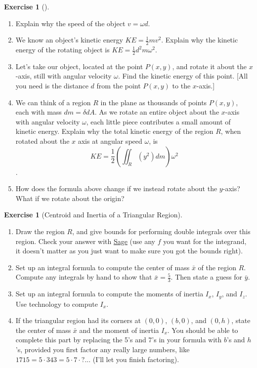 \documentclass[10pt,]{book}
\theoremstyle{plain}
\theoremstyle{definition}
\theoremstyle{definition}
\theoremstyle{definition}
\theoremstyle{definition}
\newtheorem{exploration}[project]{Exercise}
\theoremstyle{definition}
\numberwithin{equation}{section}
\newcommand{\sageDoubleIntegralCheckerURL}{http://bmw.byuimath.com/dokuwiki/doku.php?id=double_integral_calculator}
\begin{document}
\begin{exploration}[]\label{exploration-253}
\leavevmode%
\begin{enumerate}[font=\bfseries,label=(\alph*),ref=\alph*]
\item\label{task-690} Explain why the speed of the object \(v=\omega d\).%
\item\label{task-691} We know an object's kinetic energy \(KE=\frac{1}{2}mv^2\). Explain why the kinetic energy of the rotating object is \(KE = \frac{1}{2}d^2m\omega^2\).%
\item\label{task-692} Let's take our object, located at the point \(P(x,y)\), and rotate it about the \(x\)-axis, still with angular velocity \(\omega\). Find the kinetic energy of this point. [All you need is the distance \(d\) from the point \(P(x,y)\) to the \(x\)-axis.]%
\item\label{task-693} We can think of a region \(R\) in the plane as thousands of points \(P(x,y)\), each with mass \(dm=\delta dA\). As we rotate an entire object about the \(x\)-axis with angular velocity \(\omega\), each little piece contributes a small amount of kinetic energy. Explain why the total kinetic energy of the region \(R\), when rotated about the \(x\) axis at angular speed \(\omega\), is %
\begin{equation*}
KE= \frac{1}{2}\left(\iint_R (y^2)dm\right)\omega^2
\end{equation*}
.%
\item\label{task-694} How does the formula above change if we instead rotate about the \(y\)-axis? What if we rotate about the origin? %
\end{enumerate}
\end{exploration}
\begin{exploration}[Centroid and Inertia of a Triangular Region]\label{exploration-254}
\leavevmode%
\begin{enumerate}[font=\bfseries,label=(\alph*),ref=\alph*]
\item\label{task-695} Draw the region \(R\), and give bounds for performing double integrals over this region. Check your answer with \href{\\sageDoubleIntegralCheckerURL}{Sage} (use any \(f\) you want for the integrand, it doesn't matter as you just want to make sure you got the bounds right).%
\item\label{task-696} Set up an integral formula to compute the center of mass \(\bar x\) of the region \(R\).  Compute any integrals by hand to show that \(\bar x = \frac{5}{3}\).  Then state a guess for \(\bar y\).%
\item\label{task-697} Set up an integral formula to compute the moments of inertia \(I_x\), \(I_y\), and \(I_z\).  Use technology to compute \(I_x\).%
\item\label{task-698} If the triangular region had its corners at \((0,0)\), \((b,0)\), and \((0,h)\), state the center of mass \(\bar x\) and the moment of inertia \(I_x\). You should be able to complete this part by replacing the 5's and 7's in your formula with \(b\)'s and \(h\)'s, provided you first factor any really large numbers, like \(1715 = 5\cdot 343=5\cdot 7\cdot ?...\) (I'll let you finish factoring).%
\end{enumerate}
\end{exploration}
\end{document}
